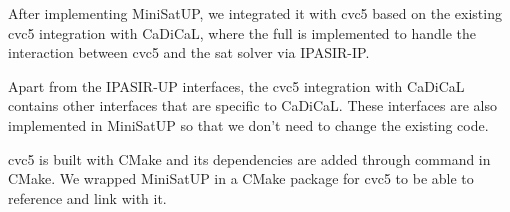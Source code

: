 
After implementing MiniSatUP, we integrated it with cvc5 based on the existing cvc5 integration with CaDiCaL, where the full  is implemented to handle the interaction between cvc5 and the sat solver via IPASIR-IP.


Apart from the IPASIR-UP interfaces, the cvc5 integration with CaDiCaL contains other interfaces that are specific to CaDiCaL. These interfaces are also implemented in MiniSatUP so that we don't need to change the existing code.


cvc5 is built with CMake and its dependencies are added through  command in CMake. We wrapped MiniSatUP in a CMake package for cvc5 to be able to reference and link with it.
